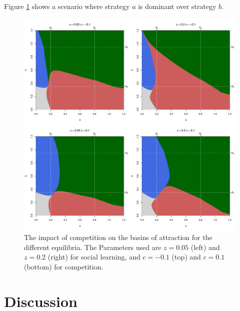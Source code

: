 \documentclass[3p,authoryear,twocolumn]{elsarticle} %
\begin{document}
Figure \ref{fig:competition} shows a scenario where strategy $a$ is dominant over strategy $b$.

\begin{figure}[h!]
  \centering
      \includegraphics[width=\textwidth]{./figures/figure7}
  \caption{The impact of competition on the basins of attraction for the different equilibria. The Parameters used are $z=0.05$ (left) and $z=0.2$ (right) for social learning, and $c=-0.1$ (top) and $c=0.1$ (bottom) for competition.}
    \label{fig:competition}
\end{figure}


\section{Discussion}

\end{document}
